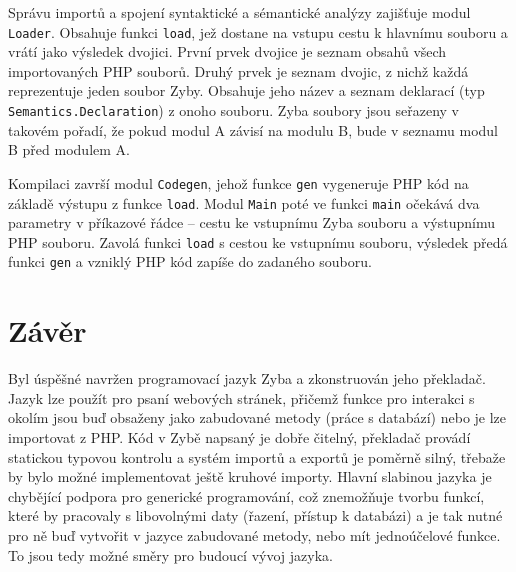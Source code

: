 \documentclass[a4paper,12pt]{article}
\begin{document}
Správu importů a spojení syntaktické a sémantické analýzy zajišťuje modul \texttt{Loader}. Obsahuje funkci \texttt{load}, jež dostane na vstupu cestu k hlavnímu souboru a vrátí jako výsledek dvojici. První prvek dvojice je seznam obsahů všech importovaných PHP souborů. Druhý prvek je seznam dvojic, z nichž každá reprezentuje jeden soubor Zyby. Obsahuje jeho název a seznam deklarací (typ \texttt{Semantics.Declaration}) z onoho souboru. Zyba soubory jsou seřazeny v takovém pořadí, že pokud modul A závisí na modulu B, bude v seznamu modul B před modulem A.

Kompilaci završí modul \texttt{Codegen}, jehož funkce \texttt{gen} vygeneruje PHP kód na základě výstupu z funkce \texttt{load}. Modul \texttt{Main} poté ve funkci \texttt{main} očekává dva parametry v příkazové řádce -- cestu ke vstupnímu Zyba souboru a výstupnímu PHP souboru. Zavolá funkci \texttt{load} s cestou ke vstupnímu souboru, výsledek předá funkci \texttt{gen} a vzniklý PHP kód zapíše do zadaného souboru.

\section{Závěr}
Byl úspěšné navržen programovací jazyk Zyba a zkonstruován jeho překladač. Jazyk lze použít pro psaní webových stránek, přičemž funkce pro interakci s okolím jsou buď obsaženy jako zabudované metody (práce s databází) nebo je lze importovat z PHP. Kód v Zybě napsaný je dobře čitelný, překladač provádí statickou typovou kontrolu a systém importů a exportů je poměrně silný, třebaže by bylo možné implementovat ještě kruhové importy. Hlavní slabinou jazyka je chybějící podpora pro generické programování, což znemožňuje tvorbu funkcí, které by pracovaly s libovolnými daty (řazení, přístup k databázi) a je tak nutné pro ně buď vytvořit v jazyce zabudované metody, nebo mít jednoúčelové funkce. To jsou tedy možné směry pro budoucí vývoj jazyka.

\newpage
\printbibliography[heading=bibintoc, title={Použitá literatura}]
\newpage
\end{document}
